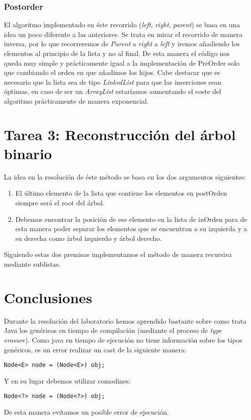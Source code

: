 \documentclass{article}
\begin{document}
        \subsubsection{Postorder}
        El algoritmo implementado en éste recorrido (\textit{left}, \textit{right}, \textit{parent})
        se basa en una idea un poco diferente a las anteriores.\newline
        Se trata en mirar el recorrido de manera inversa, por lo que recorreremos de \textit{Parent} a \textit{right} a \textit{left} y iremos añadiendo los elementos al principio de la lista y no al final. De esta manera el código nos queda muy simple y prácticamente igual a la implementación de PreOrder solo que cambiando el orden en que añadimos los hijos.  \newline
        Cabe destacar que es necesario que la lista sea de tipo \textit{LinkedList} para que las inserciones sean óptimas, en caso de ser un \textit{ArrayList} estaríamos aumentando el coste del algoritmo prácticamente de manera exponencial.
        

\section{Tarea 3: Reconstrucción del árbol binario}
La idea en la resolución de éste método se basa en los dos argumentos siguientes:
\begin{enumerate}
    \item El último elemento de la lista que contiene los elementos en postOrden siempre será el root del árbol.
    \item Debemos encontrar la posición de ese elemento en la lista de inOrden para de esta manera poder separar los elementos que se encuentran a su izquierda y a su derecha como árbol izquierdo y árbol derecho.
\end{enumerate}
Siguiendo estas dos premisas implementamos el método de manera recursiva mediante sublistas.

\section{Conclusiones}

Durante la resolución del laboratorio hemos aprendido bastante sobre como trata Java los genéricos en tiempo de compilación (mediante el proceso de \textit{type erasure}).
Como java en tiempo de ejecución no tiene información sobre los tipos genéricos, es un error realizar un cast de la siguiente manera:
\begin{verbatim}
Node<E> node = (Node<E>) obj;
\end{verbatim}
\newline
Y en su lugar debemos utilizar comodines:
\begin{verbatim}
Node<?> node = (Node<?>) obj;
\end{verbatim}
De esta manera evitamos un posible error de ejecución.
\end{document}
